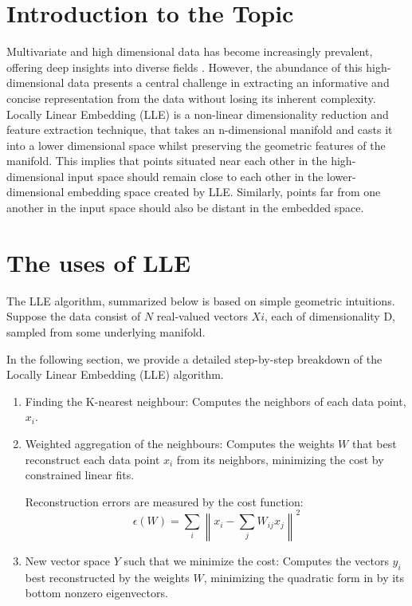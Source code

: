 
\tableofcontents
\pagebreak

\section{Introduction to the Topic}
Multivariate and high dimensional data has become increasingly prevalent, offering deep insights into diverse fields . However, the abundance of this high-dimensional data presents a central challenge in extracting an informative and concise representation from the data without losing its inherent complexity. Locally Linear Embedding (LLE) is a non-linear dimensionality reduction and feature extraction technique, that takes an n-dimensional manifold and casts it into a lower dimensional space whilst preserving the geometric features of the manifold. This implies that points situated near each other in the high-dimensional input space should remain close to each other in the lower-dimensional embedding space created by LLE. Similarly, points far from one another in the input space should also be distant in the embedded space.

\section{The uses of LLE}
The LLE algorithm, summarized below is based on simple geometric intuitions. Suppose the data consist of $N$ real-valued vectors $X
i$, each of dimensionality D, sampled from some underlying manifold. 

In the following section, we provide a detailed step-by-step breakdown of the Locally Linear Embedding (LLE) algorithm.
\begin{enumerate}
    \item Finding the K-nearest neighbour: 
    Computes the neighbors of each data point, $x_i$.
    \item Weighted aggregation of the neighbours:
    Computes the weights $W$ that best reconstruct each data point $x_i$ from its neighbors, minimizing the cost by constrained linear fits.

    Reconstruction errors are measured by the cost function:
\begin{equation}
\epsilon(W) = \sum_{i} \left\| x_i - \sum_{j} W_{ij} x_j \right\|^2
\end{equation}

    \item New vector space $Y$ such that we minimize the cost:
    Computes the vectors $y_i$ best reconstructed by the weights $W$, minimizing the quadratic form in by its bottom nonzero eigenvectors.
    \label{alg}
\end{enumerate}

